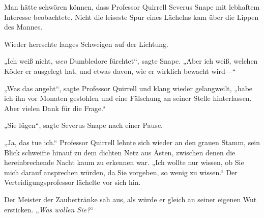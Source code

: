 Man hätte schwören können, dass Professor Quirrell Severus Snape mit lebhaftem Interesse beobachtete. Nicht die leiseste Spur eines Lächelns kam über die Lippen des Mannes.

Wieder herrschte langes Schweigen auf der Lichtung.

„Ich weiß nicht, \emph{wen} Dumbledore fürchtet“, sagte Snape. „Aber ich weiß, welchen Köder er ausgelegt hat, und etwas davon, wie er wirklich bewacht wird—“

„Was das angeht“, sagte Professor Quirrell und klang wieder gelangweilt, „habe ich ihn vor Monaten gestohlen und eine Fälschung an seiner Stelle hinterlassen. Aber vielen Dank für die Frage.“

„Sie lügen“, sagte Severus Snape nach einer Pause.

„Ja, das tue ich.“ Professor Quirrell lehnte sich wieder an den grauen Stamm, sein Blick schweifte hinauf zu dem dichten Netz aus Ästen, zwischen denen die hereinbrechende Nacht kaum zu erkennen war. „Ich wollte nur wissen, ob Sie mich darauf ansprechen würden, da Sie vorgeben, so wenig zu wissen.“ Der Verteidigungsprofessor lächelte vor sich hin.

Der Meister der Zaubertränke sah aus, als würde er gleich an seiner eigenen Wut ersticken. „\emph{Was wollen Sie?}“

